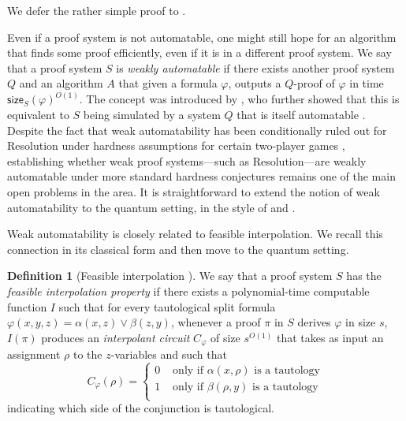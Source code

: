 \documentclass[11pt]{article}
\theoremstyle{definition}
\newtheorem{definition}{Definition}[section]
\theoremstyle{plain}
\theoremstyle{remark}
\newcommand{\size}[2]{\mathsf{size}_{#1}(#2)}
\let\autocite\cite\let\textcite\citet
\begin{document}
We defer the rather simple proof to .

Even if a proof system is not automatable, one might still hope for an algorithm that finds some proof efficiently, even if it is in a different proof system. We say that a proof system $S$ is \emph{weakly automatable} if there exists another proof system $Q$ and an algorithm $A$ that given a formula $\varphi$, outputs a $Q$-proof of $\varphi$ in time $\size{S}{\varphi}^{O(1)}$. The concept was introduced by \citeauthor{AB04} \cite{AB04}, who further showed that this is equivalent to $S$ being simulated by a system $Q$ that is itself automatable \autocite[Thm.\ 1]{AB04}. Despite the fact that weak automatability has been conditionally ruled out for Resolution under hardness assumptions for certain two-player games \cite{atseriasManeva, huangPitassi, BPT14}, establishing whether weak proof systems---such as Resolution---are weakly automatable under more standard hardness conjectures remains one of the main open problems in the area. It is straightforward to extend the notion of weak automatability to the quantum setting, in the style of  and .

Weak automatability is closely related to feasible interpolation. We recall this connection in its classical form and then move to the quantum setting.

\begin{definition}[Feasible interpolation \cite{Kra97, pudlak03}]
\label{def:fi}
We say that a proof system $S$ has the \emph{feasible interpolation property} if there exists a polynomial-time computable function $I$ such that for every tautological split formula $\varphi(x, y, z) = \alpha(x, z) \lor \beta(z, y)$, whenever a proof $\pi$ in $S$ derives $\varphi$ in size $s$, $I(\pi)$ produces an \emph{interpolant circuit} $C_{\varphi}$ of size $s^{O(1)}$ that takes as input an assignment $\rho$ to the $z$-variables and such that
\begin{equation*}
    C_\varphi(\rho) = \begin{cases}
        0 &\text{ only if } \alpha(x, \rho) \text{ is a tautology} \\
        1 &\text{ only if } \beta(\rho, y) \text{ is a tautology} \\
    \end{cases}
\end{equation*}
indicating which side of the conjunction is tautological.
\end{definition}
\end{document}
